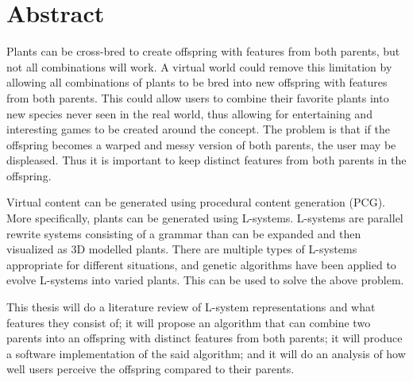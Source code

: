 \chapter*{Abstract}

Plants can be cross-bred to create offspring with features from both parents, but not all combinations will work.
A virtual world could remove this limitation by allowing all combinations of plants to be bred into new offspring with features from both parents.
This could allow users to combine their favorite plants into new species never seen in the real world, thus allowing for entertaining and interesting games to be created around the concept.
The problem is that if the offspring becomes a warped and messy version of both parents, the user may be displeased.
Thus it is important to keep distinct features from both parents in the offspring.

Virtual content can be generated using procedural content generation (PCG).
More specifically, plants can be generated using L-systems.
L-systems are parallel rewrite systems consisting of a grammar than can be expanded and then visualized as 3D modelled plants.
There are multiple types of L-systems appropriate for different situations, and genetic algorithms have been applied to evolve L-systems into varied plants.
This can be used to solve the above problem.

This thesis will do a literature review of L-system representations and what features they consist of; it will propose an algorithm that can combine two parents into an offspring with distinct features from both parents; it will produce a software implementation of the said algorithm; and it will do an analysis of how well users perceive the offspring compared to their parents.

\hypersetup{pageanchor=false}